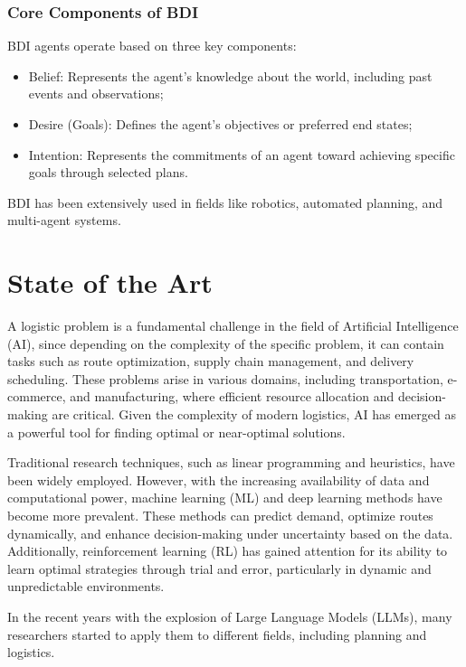 \subsubsection{Core Components of BDI}
BDI agents operate based on three key components:
\begin{itemize}
  \item Belief: Represents the agent's knowledge about the world, including past
    events and observations;

  \item Desire (Goals): Defines the agent's objectives or preferred end states;

  \item Intention: Represents the commitments of an agent toward achieving
    specific goals through selected plans.
\end{itemize}

BDI has been extensively used in fields like robotics, automated planning, and
multi-agent systems.

\section{State of the Art}
\label{sec:state_of_the_art}

A logistic problem is a fundamental challenge in the field of Artificial Intelligence
(AI), since depending on the complexity of the specific problem, it can contain tasks
such as route optimization, supply chain management, and delivery scheduling.
These problems arise in various domains, including transportation, e-commerce, and
manufacturing, where efficient resource allocation and decision-making are
critical. Given the complexity of modern logistics, AI has emerged as a powerful
tool for finding optimal or near-optimal solutions.

Traditional research techniques, such as linear programming and heuristics, have
been widely employed. However, with the increasing availability of data and
computational power, machine learning (ML) and deep learning methods have become
more prevalent. These methods can predict demand, optimize routes dynamically,
and enhance decision-making under uncertainty based on the data. Additionally,
reinforcement learning (RL) has gained attention for its ability to learn
optimal strategies through trial and error, particularly in dynamic and unpredictable
environments.

In the recent years with the explosion of Large Language Models (LLMs), many
researchers started to apply them to different fields, including planning and logistics.

